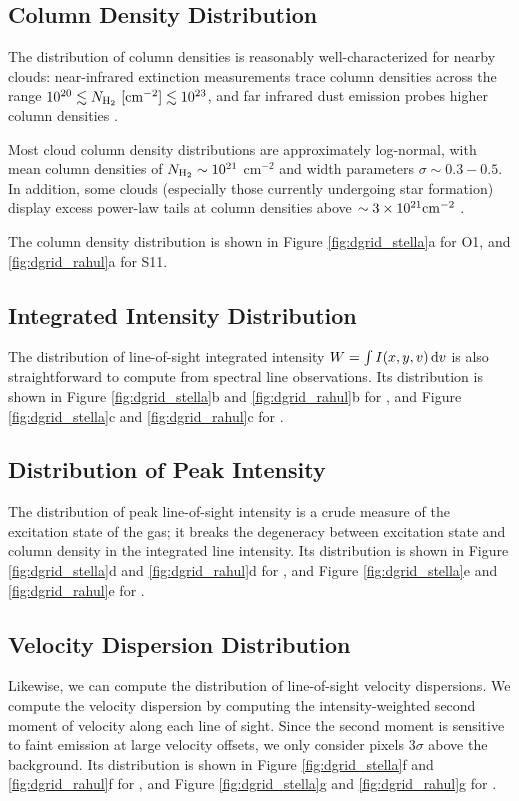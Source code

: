 {\subsection{Column Density Distribution}
The distribution of column densities is reasonably well-characterized for nearby clouds: near-infrared extinction measurements trace column densities
across the range $10^{20} \lesssim N_{\rm H_2}~  [{\rm cm}^{-2}]  \lesssim 10^{23} $, and far infrared dust emission probes higher column densities \citep{http://adsabs.harvard.edu/abs/2009ApJ...692...91G, http://adsabs.harvard.edu/abs/2012ApJ...752...55K, 2009A&A...493..735L, 2009A&A...508L..35K}.

Most cloud column density distributions are approximately log-normal, with mean column densities of $N_{\rm H_2} \sim 10^{21}$ cm$^{-2}$ and width parameters $\sigma \sim 0.3-0.5$. In addition, some clouds (especially those currently undergoing star formation) display excess power-law tails at column densities above $\sim 3 \times 10^{21} {\rm cm}^{-2}$  \citep{http://adsabs.harvard.edu/abs/2009ApJ...692...91G, 2009A&A...508L..35K}.

The column density distribution is shown in Figure \ref{fig:dgrid_stella}a for O1, and \ref{fig:dgrid_rahul}a for S11.

\subsection{Integrated Intensity Distribution}
The distribution of line-of-sight integrated intensity $W=\int I(x, y, v)\, {\rm d}v$  is also straightforward to compute from spectral line observations. Its distribution is shown in Figure  \ref{fig:dgrid_stella}b and \ref{fig:dgrid_rahul}b for \coa, and  Figure \ref{fig:dgrid_stella}c and \ref{fig:dgrid_rahul}c for \coc.

\subsection{Distribution of Peak Intensity}
The distribution of peak line-of-sight intensity is a crude measure of the excitation state of the gas; it breaks the degeneracy between excitation state and column density in the integrated line intensity. Its distribution is shown in Figure  \ref{fig:dgrid_stella}d and \ref{fig:dgrid_rahul}d for \coa, and  Figure \ref{fig:dgrid_stella}e and \ref{fig:dgrid_rahul}e for \coc.

\subsection{Velocity Dispersion Distribution}
Likewise, we can compute the distribution of line-of-sight velocity dispersions. We compute the velocity dispersion by computing the intensity-weighted second moment of velocity along each line of sight. Since the second moment is sensitive to faint emission at large velocity offsets, we only consider pixels 3$\sigma$ above the background. Its distribution is shown in Figure  \ref{fig:dgrid_stella}f and \ref{fig:dgrid_rahul}f for \coa, and  Figure \ref{fig:dgrid_stella}g and \ref{fig:dgrid_rahul}g for \coc.

}
